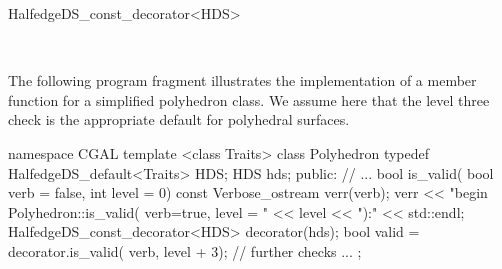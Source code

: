 \begin{ccRefClass}{HalfedgeDS_const_decorator<HDS>}



\ccSeeAlso

\\

\ccExample

The following program fragment illustrates the implementation of a
 member function for a simplified polyhedron class.
We assume here that the level three check is the appropriate default
for polyhedral surfaces.

\begin{ccExampleCode}
namespace CGAL {
    template <class Traits>
    class Polyhedron {
        typedef HalfedgeDS_default<Traits> HDS;
        HDS hds;
    public:
        // ...
        bool is_valid( bool verb = false, int level = 0) const {
            Verbose_ostream verr(verb);
            verr << "begin Polyhedron::is_valid( verb=true, level = " << level 
                 << "):" << std::endl;
            HalfedgeDS_const_decorator<HDS> decorator(hds);
            bool valid = decorator.is_valid( verb, level + 3);
            // further checks ...
        }
    };
}
\end{ccExampleCode}

\end{ccRefClass}

\ccRefPageEnd

